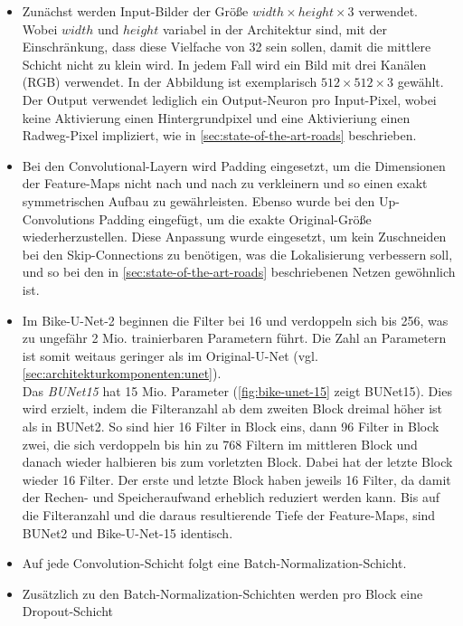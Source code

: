 \begin{itemize}
	\item Zunächst werden Input-Bilder der Größe $width \times height \times 3$ verwendet. 
	Wobei $width$ und $height$ variabel in der Architektur sind, mit der Einschränkung, 
	dass diese Vielfache von 32 sein sollen, damit die mittlere Schicht nicht zu klein wird. 
	In jedem Fall wird ein Bild mit drei Kanälen (RGB) verwendet. 
	In der Abbildung ist exemplarisch $512 \times 512 \times 3$ gewählt. \\
	Der Output verwendet lediglich ein Output-Neuron pro Input-Pixel, wobei keine Aktivierung einen Hintergrundpixel 
	und eine Aktivieriung einen Radweg-Pixel impliziert, wie in \autoref{sec:state-of-the-art-roads} beschrieben. 
	\item Bei den Convolutional-Layern wird Padding eingesetzt,
	um die Dimensionen der Feature-Maps nicht nach und nach zu verkleinern und so einen exakt symmetrischen Aufbau zu gewährleisten.
	Ebenso wurde bei den Up-Convolutions Padding eingefügt, um die exakte Original-Größe wiederherzustellen.
	Diese Anpassung wurde eingesetzt, um kein Zuschneiden bei den Skip-Connections zu benötigen, was die Lokalisierung verbessern soll,
	und so bei den in \autoref{sec:state-of-the-art-roads} beschriebenen Netzen gewöhnlich ist.
	\item 
	Im Bike-U-Net-2 beginnen die Filter bei 16 und verdoppeln sich bis 256, was zu ungefähr 2 Mio. 
	trainierbaren Parametern führt. Die Zahl an Parametern ist somit weitaus geringer als im 
	Original-U-Net (vgl. \autoref{sec:architekturkomponenten:unet}). \\
    Das \textit{\acf{BUNet15}} hat 15 Mio. Parameter (\autoref{fig:bike-unet-15} zeigt \ac{BUNet15}). Dies wird erzielt, 
	indem die Filteranzahl ab dem zweiten Block dreimal höher ist als in \ac{BUNet2}. So sind hier 16 Filter in Block eins, 
	dann 96 Filter in Block zwei, die sich verdoppeln bis hin zu 768 Filtern im mittleren Block und danach wieder halbieren bis zum vorletzten Block. 
	Dabei hat der letzte Block wieder 16 Filter. 
	Der erste und letzte Block haben jeweils 16 Filter, da damit der Rechen- und Speicheraufwand erheblich reduziert werden kann.
	Bis auf die Filteranzahl und die daraus resultierende Tiefe der Feature-Maps, sind \ac{BUNet2} und Bike-U-Net-15 identisch.
	\item Auf jede Convolution-Schicht folgt eine Batch-Normalization-Schicht. 
	\item Zusätzlich zu den Batch-Normalization-Schichten werden pro Block eine Dropout-Schicht 

\end{itemize}
